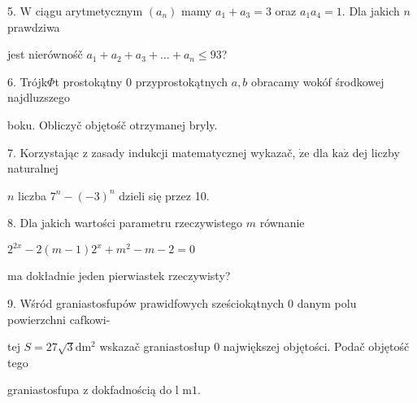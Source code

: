 \documentclass[a4paper,12pt]{article}
\begin{document}
5. $\mathrm{W}$ ciągu arytmetycznym $(a_{n})$ mamy $a_{1}+a_{3}=3$ oraz $a_{1}a_{4}=1$. Dla jakich $n$ prawdziwa

jest nierównośč $a_{1}+a_{2}+a_{3}+\ldots+a_{n}\leq 93$?

6. Trójk$\Phi$t prostokątny $0$ przyprostokątnych $a, b$ obracamy wokóf środkowej najdluzszego

boku. Obliczyč objętośč otrzymanej bryly.

7. Korzystając $\mathrm{z}$ zasady indukcji matematycznej wykazač, $\dot{\mathrm{z}}\mathrm{e}$ dla $\mathrm{k}\mathrm{a}\dot{\mathrm{z}}$ dej liczby naturalnej

$n$ liczba $7^{n}-(-3)^{n}$ dzieli się przez 10.

8. Dla jakich wartości parametru rzeczywistego $m$ równanie

$2^{2x}-2(m-1)2^{x}+m^{2}-m-2=0$

ma dokładnie jeden pierwiastek rzeczywisty?

9. Wśród graniastosfupów prawidfowych sześciokątnych $0$ danym polu powierzchni cafkowi-

tej $S=27\sqrt{3}\mathrm{d}\mathrm{m}^{2}$ wskazač graniastosłup $0$ największej objętości. Podač objętośč tego

graniastosfupa $\mathrm{z}$ dokfadnością do l $\mathrm{m}1.$
\end{document}
